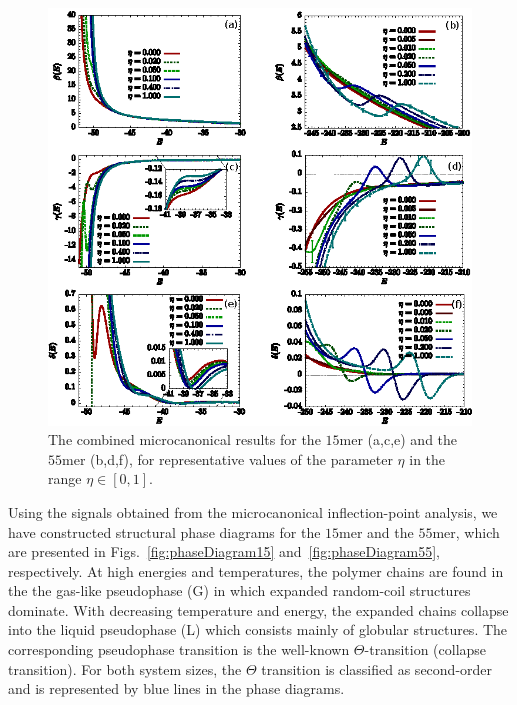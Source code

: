 \documentclass[12pt]{report}
\begin{document}
%
\begin{figure}
\center
    \includegraphics[width=1.0\textwidth]{chapter6Figs/microcanonicalAnalysis.eps}%
    \caption{\label{fig:microcanonicalAnalysis}
	The combined microcanonical results for the $15$mer (a,c,e) and the $55$mer (b,d,f), for representative values of the parameter $\eta$ in the range $\eta\in[0,1]$.}
\end{figure}
%

\newpage
Using the signals obtained from the microcanonical inflection-point analysis, we have constructed structural phase diagrams for the $15$mer and the $55$mer, which are presented in Figs.~\ref{fig:phaseDiagram15} and~\ref{fig:phaseDiagram55}, respectively. At high energies and temperatures, the polymer chains are found in the the gas-like pseudophase (G) in which expanded random-coil structures dominate. With decreasing temperature and energy, the expanded chains collapse into the liquid pseudophase (L) which consists mainly of globular structures. The corresponding pseudophase transition is the well-known $\Theta$-transition (collapse transition). For both system sizes, the $\Theta$ transition is classified as second-order and is represented by blue lines in the phase diagrams.
\end{document}
